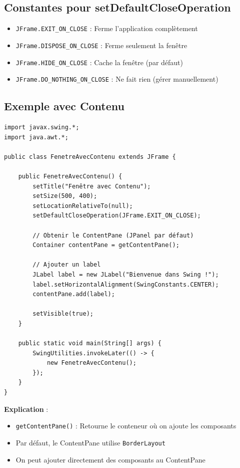 \documentclass[11pt,a4paper]{article}
\begin{document}
\subsection{Constantes pour setDefaultCloseOperation}

\begin{itemize}
    \item \texttt{JFrame.EXIT\_ON\_CLOSE} : Ferme l'application complètement
    \item \texttt{JFrame.DISPOSE\_ON\_CLOSE} : Ferme seulement la fenêtre
    \item \texttt{JFrame.HIDE\_ON\_CLOSE} : Cache la fenêtre (par défaut)
    \item \texttt{JFrame.DO\_NOTHING\_ON\_CLOSE} : Ne fait rien (gérer manuellement)
\end{itemize}

\subsection{Exemple avec Contenu}

\begin{lstlisting}
import javax.swing.*;
import java.awt.*;

public class FenetreAvecContenu extends JFrame {
    
    public FenetreAvecContenu() {
        setTitle("Fenêtre avec Contenu");
        setSize(500, 400);
        setLocationRelativeTo(null);
        setDefaultCloseOperation(JFrame.EXIT_ON_CLOSE);
        
        // Obtenir le ContentPane (JPanel par défaut)
        Container contentPane = getContentPane();
        
        // Ajouter un label
        JLabel label = new JLabel("Bienvenue dans Swing !");
        label.setHorizontalAlignment(SwingConstants.CENTER);
        contentPane.add(label);
        
        setVisible(true);
    }
    
    public static void main(String[] args) {
        SwingUtilities.invokeLater(() -> {
            new FenetreAvecContenu();
        });
    }
}
\end{lstlisting}

\textbf{Explication} :
\begin{itemize}
    \item \texttt{getContentPane()} : Retourne le conteneur où on ajoute les composants
    \item Par défaut, le ContentPane utilise \texttt{BorderLayout}
    \item On peut ajouter directement des composants au ContentPane
\end{itemize}
\end{document}
